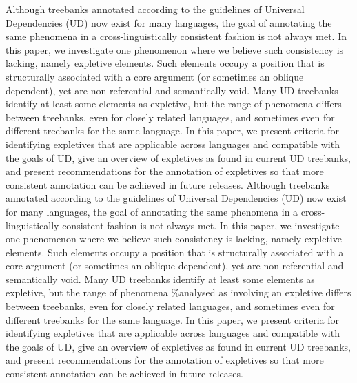 Although treebanks annotated according to the guidelines of Universal Dependencies (UD) now exist for many languages, the goal of annotating the same phenomena in a cross-linguistically consistent fashion is not always met. In this paper, we investigate one phenomenon where we believe such consistency is lacking, namely expletive elements. Such elements occupy a position that is structurally associated with a core argument (or sometimes an oblique dependent), yet are non-referential and semantically void. Many UD treebanks identify at least some elements as expletive, but the range of phenomena differs between treebanks, even for closely related languages, and sometimes even for different treebanks for the same language. In this paper, we present criteria for identifying expletives that are applicable across languages and compatible with the goals of UD, give an overview of expletives as found in current UD treebanks, and present recommendations for the annotation of expletives so that more consistent annotation can be achieved in future releases. Although treebanks annotated according to the guidelines of Universal Dependencies (UD) now exist for many languages, the goal of annotating the same phenomena in a cross-linguistically consistent fashion is not always met. In this paper, we investigate one phenomenon where we believe such consistency is lacking, namely expletive elements. Such elements occupy a position that is structurally associated with a core argument (or sometimes an oblique dependent), yet are non-referential and semantically void. Many UD treebanks identify at least some elements as expletive, but the range of phenomena \%analysed as involving an expletive differs between treebanks, even for closely related languages, and sometimes even for different treebanks for the same language. In this paper, we present criteria for identifying expletives that are applicable across languages and compatible with the goals of UD, give an overview of expletives as found in current UD treebanks, and present recommendations for the annotation of expletives so that more consistent annotation can be achieved in future releases.
